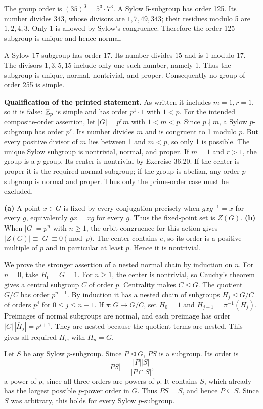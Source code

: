 The group order is $(35)^3=5^3\cdot7^3$. A Sylow 5-subgroup has order 125. Its number divides $343$, whose divisors are $1,7,49,343$; their residues modulo 5 are $1,2,4,3$. Only 1 is allowed by Sylow's congruence. Therefore the order-125 subgroup is unique and hence normal.

A Sylow 17-subgroup has order 17. Its number divides $15$ and is 1 modulo 17. The divisors $1,3,5,15$ include only one such number, namely 1. Thus the subgroup is unique, normal, nontrivial, and proper. Consequently no group of order 255 is simple.

\textbf{Qualification of the printed statement.} As written it includes $m=1,r=1$, so it is false: $\mathbb{Z}_p$ is simple and has order $p^1\cdot1$ with $1<p$.
For the intended composite-order assertion, let $|G|=p^r m$ with $1<m<p$. Since $p\nmid m$, a Sylow $p$-subgroup has order $p^r$. Its number divides $m$ and is congruent to 1 modulo $p$. But every positive divisor of $m$ lies between 1 and $m<p$, so only 1 is possible. The unique Sylow subgroup is nontrivial, normal, and proper.
If $m=1$ and $r>1$, the group is a $p$-group. Its center is nontrivial by Exercise 36.20. If the center is proper it is the required normal subgroup; if the group is abelian, any order-$p$ subgroup is normal and proper. Thus only the prime-order case must be excluded.

\textbf{(a)} A point $x\in G$ is fixed by every conjugation precisely when $gxg^{-1}=x$ for every $g$, equivalently $gx=xg$ for every $g$. Thus the fixed-point set is $Z(G)$.
\textbf{(b)} When $|G|=p^n$ with $n\ge1$, the orbit congruence for this action gives
$|Z(G)|\equiv|G|\equiv0\pmod p$.
The center contains $e$, so its order is a positive multiple of $p$ and in particular at least $p$. Hence it is nontrivial.

We prove the stronger assertion of a nested normal chain by induction on $n$. For $n=0$, take $H_0=G=1$.
For $n\ge1$, the center is nontrivial, so Cauchy's theorem gives a central subgroup $C$ of order $p$. Centrality makes $C\trianglelefteq G$.
The quotient $G/C$ has order $p^{n-1}$. By induction it has a nested chain of subgroups $\overline H_j\trianglelefteq G/C$ of orders $p^j$ for $0\le j\le n-1$.
If $\pi:G\to G/C$, set $H_0=1$ and $H_{j+1}=\pi^{-1}(\overline H_j)$. Preimages of normal subgroups are normal, and each preimage has order $|C|\,|\overline H_j|=p^{j+1}$. They are nested because the quotient terms are nested. This gives all required $H_i$, with $H_n=G$.

Let $S$ be any Sylow $p$-subgroup. Since $P\trianglelefteq G$, $PS$ is a subgroup. Its order is
\[
|PS|=\frac{|P||S|}{|P\cap S|},
\]
a power of $p$, since all three orders are powers of $p$. It contains $S$, which already has the largest possible $p$-power order in $G$. Thus $PS=S$, and hence $P\subseteq S$. Since $S$ was arbitrary, this holds for every Sylow $p$-subgroup.
